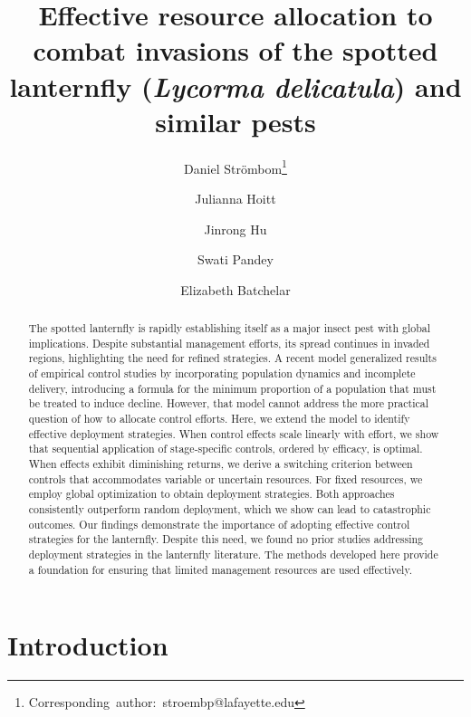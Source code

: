 \documentclass[onecolumn]{article}
\title{Effective resource allocation to combat invasions of the spotted lanternfly (\textit{Lycorma delicatula}) and similar pests}
\author[]{Daniel Str\"{o}mbom\thanks{\mbox{Corresponding author: stroembp@lafayette.edu}}}
\author[]{Julianna Hoitt}
\author[]{Jinrong Hu}
\author[]{Swati Pandey}
\author[]{Elizabeth Batchelar}
\affil[]{Department of Biology, Lafayette College, Easton, PA 18042, USA}
\date{}
\begin{document}
\maketitle

\begin{abstract}
The spotted lanternfly is rapidly establishing itself as a major insect pest with global implications. Despite substantial management efforts, its spread continues in invaded regions, highlighting the need for refined strategies. A recent model generalized results of empirical control studies by incorporating population dynamics and incomplete delivery, introducing a formula for the minimum proportion of a population that must be treated to induce decline. However, that model cannot address the more practical question of how to allocate control efforts. Here, we extend the model to identify effective deployment strategies. When control effects scale linearly with effort, we show that sequential application of stage‑specific controls, ordered by efficacy, is optimal. When effects exhibit diminishing returns, we derive a switching criterion between controls that accommodates variable or uncertain resources. For fixed resources, we employ global optimization to obtain deployment strategies. Both approaches consistently outperform random deployment, which we show can lead to catastrophic outcomes. Our findings demonstrate the importance of adopting effective control strategies for the lanternfly. Despite this need, we found no prior studies addressing deployment strategies in the lanternfly literature. The methods developed here provide a foundation for ensuring that limited management resources are used effectively.
\end{abstract}

\section*{Introduction}
\end{document}

